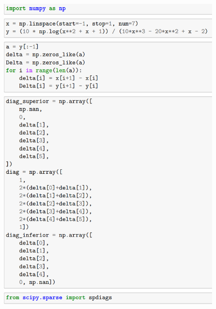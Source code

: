 \begin{frame}
    \begin{solution}
        \begin{figure}[ht!]
            \centering
            \includegraphics[width=.4\paperwidth]{8a}
        \end{figure}
    \end{solution}
\end{frame}

